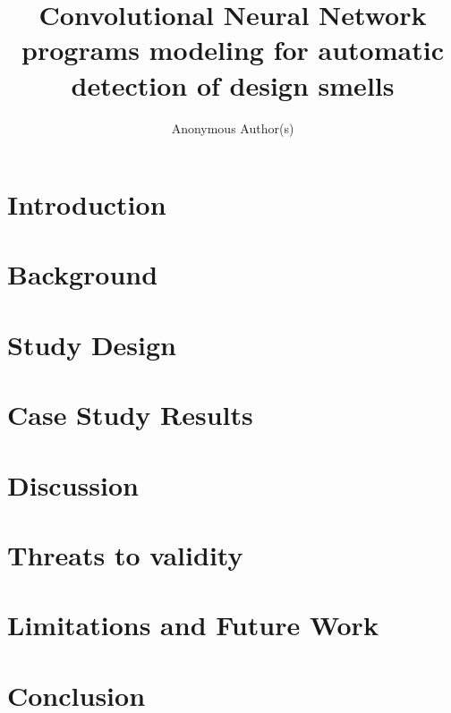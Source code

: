 \documentclass[10pt, conference]{IEEEtran}
\title{Convolutional Neural Network programs modeling for automatic detection of design smells}
\author{Anonymous Author(s)}
\begin{document}
\maketitle





\section{Introduction}


\section{Background}



\section{Study Design}


\section{Case Study Results}


\section{Discussion}


\section{Threats to validity}


\section{Limitations and Future Work}


\section{Conclusion}


\balance



\end{document}
